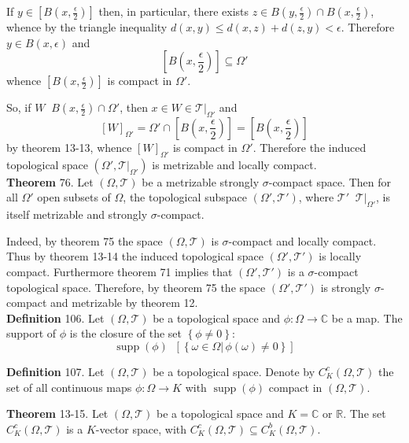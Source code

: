 \documentclass[a4paper]{article}
\newcommand{\obj}[1]{\left\{ #1 \right \}}
\newcommand{\clo}[1]{\left [ #1 \right ]}
\newcommand{\brac}[1]{\left ( #1 \right )}
\newcommand{\induc}[1]{\left . #1 \right \vert}
\newcommand{\Real}{\mathbb{R}}
\newcommand{\Cplx}{\mathbb{C}}
\newcommand{\Tcal}{\mathcal{T}}
\newcommand{\Supp}[1]{\operatorname{supp}\nolimits\brac{#1}}
\newcommand{\defn}{\mathop{\overset{\Delta}{=}}\nolimits}
\begin{document}
If $y\in \clo{B\brac{x,\frac{\epsilon}{2}}}$ then, in particular, there exists $z\in B\brac{y,\frac{\epsilon}{2}} \cap B\brac{x,\frac{\epsilon}{2}}$, whence by the triangle inequality $d\brac{x,y}\leq d\brac{x,z} + d\brac{z,y} < \epsilon$. Therefore $y\in B\brac{x,\epsilon}$ and \[\clo{B\brac{x,\frac{\epsilon}{2}}}\subseteq \Omega'\] whence $\clo{B\brac{x,\frac{\epsilon}{2}}}$ is compact in $\Omega'$.

So, if $W\defn B\brac{x,\frac{\epsilon}{2}}\cap \Omega'$, then $x\in W\in \induc{\Tcal}_{\Omega'}$ and \[\clo{W}_{\Omega'} = \Omega'\cap \clo{B\brac{x,\frac{\epsilon}{2}}}=\clo{B\brac{x,\frac{\epsilon}{2}}}\] by theorem 13-13, whence $\clo{W}_{\Omega'}$ is compact in $\Omega'$. Therefore the induced topological space $\brac{\Omega',\induc{\Tcal}_{\Omega'}}$ is metrizable and locally compact.\\

\label{thm:subspace_strong_compact} \noindent \textbf{Theorem} 76.
Let $\brac{\Omega,\Tcal}$ be a metrizable strongly $\sigma$-compact space. Then for all $\Omega'$ open subsets of $\Omega$, the topological subspace $\brac{\Omega',\Tcal'}$, where $\Tcal'\defn \induc{\Tcal}_{\Omega'}$, is itself metrizable and strongly $\sigma$-compact.

Indeed, by theorem 75 the space $\brac{\Omega, \Tcal}$ is $\sigma$-compact and locally compact. Thus by theorem 13-14 the induced topological space $\brac{\Omega',\Tcal'}$ is locally compact. Furthermore theorem 71 implies that $\brac{\Omega',\Tcal'}$ is a $\sigma$-compact topological space. Therefore, by theorem 75 the space $\brac{\Omega',\Tcal'}$ is strongly $\sigma$-compact and metrizable by theorem 12.\\

\noindent\textbf{Definition} 106.
Let $\brac{\Omega,\Tcal}$ be a topological space and $\phi:\Omega\to \Cplx$ be a map. The support of $\phi$ is the closure of the set $\obj{\phi\neq 0}$:\[\Supp{\phi}\defn \clo{\obj{ \induc{\omega\in\Omega}\,\phi\brac{\omega}\neq 0 }}\]

\noindent\textbf{Definition} 107.
Let $\brac{\Omega, \Tcal}$ be a topological space. Denote by $C^c_K\brac{\Omega,\Tcal}$ the set of all continuous maps $\phi:\Omega\to K$ with $\Supp{\phi}$ compact in $\brac{\Omega,\Tcal}$.

\label{thm:compact_support_functions}\noindent \textbf{Theorem} 13-15.
Let $\brac{\Omega,\Tcal}$ be a topological space and $K=\Cplx$ or $\Real$. The set $C^c_K\brac{\Omega,\Tcal}$ is a $K$-vector space, with $C^c_K\brac{\Omega,\Tcal}\subseteq C^b_K\brac{\Omega,\Tcal}$.
\end{document}
